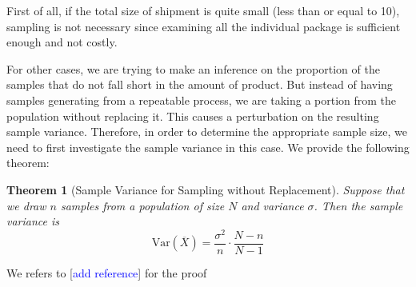 \documentclass{article}
\newtheorem{theorem}{Theorem}[section]
\def\Var{\mathrm{Var}}
\def\unf#1{\textcolor{blue}{#1}}
\begin{document}
First of all, if the total size of shipment is quite small (less than or equal to 10), sampling is not necessary since examining all the individual package is sufficient enough and not costly. 

For other cases, we are trying to make an inference on the proportion of the samples that do not fall short in the amount of product. But instead of having samples generating from a repeatable process, we are taking a portion from the population without replacing it. This causes a perturbation on the resulting sample variance. Therefore, in order to determine the appropriate sample size, we need to first investigate the sample variance in this case. We provide the following theorem:

\begin{theorem}[Sample Variance for Sampling without Replacement]
    Suppose that we draw $n$ samples from a population of size $N$ and variance $\sigma$. Then the sample variance is
    $$
    \Var(\overline{X}) = \dfrac{\sigma^2}{n}\cdot\dfrac{N-n}{N-1}
    $$
\end{theorem}

We refers to [\unf{add reference}] for the proof
\end{document}
